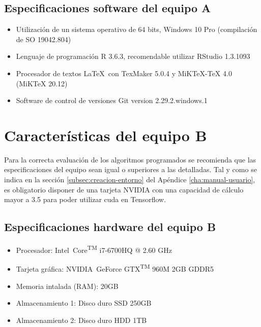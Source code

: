 \subsection{Especificaciones software del equipo A}
\label{subsec:especificaciones-software-equipoa}
\begin{itemize}
    \item Utilización de un sistema operativo de 64 bits, Windows 10 Pro (compilación de SO 19042.804)
    \item Lenguaje de programación R 3.6.3, recomendable utilizar RStudio 1.3.1093
    \item Procesador de textos \LaTeX\ con TexMaker 5.0.4 y MiKTeX-TeX 4.0 (MiKTeX 20.12)
    \item Software de control de versiones Git version 2.29.2.windows.1
\end{itemize}

\section{Características del equipo B}
\label{sec:caracteristicas-segun-equipob}

Para la correcta evaluación de los algoritmos programados se recomienda que las especificaciones del equipo sean igual o superiores a las detalladas. Tal y como se indica en la sección \ref{subsec:creacion-entorno} del Apéndice \ref{cha:manual-usuario}, es obligatorio disponer de una tarjeta NVIDIA con una capacidad de cálculo mayor a 3.5 para poder utilizar \gls{cuda} en Tensorflow.

\subsection{Especificaciones hardware del equipo B}
\label{subsec:especificaciones-hardware-equipob}

\begin{itemize}
    \item Procesador: Intel\textregistered\ Core\textsuperscript{TM} i7-6700HQ @ 2.60 GHz
    \item Tarjeta gráfica: NVIDIA\textregistered\ GeForce GTX\textsuperscript{TM} 960M 2GB GDDR5
    \item Memoria intalada (RAM): 20GB
    \item Almacenamiento 1: Disco duro SSD 250GB
    \item Almacenamiento 2: Disco duro HDD 1TB
\end{itemize}

